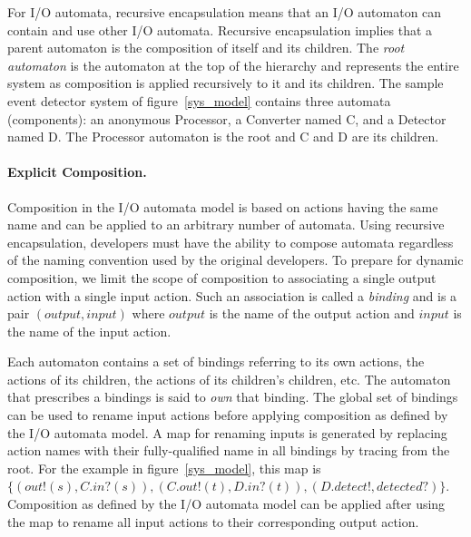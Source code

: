For I/O automata, recursive encapsulation means that an I/O automaton can contain and use other I/O automata.
Recursive encapsulation implies that a parent automaton is the composition of itself and its children.
The \emph{root automaton} is the automaton at the top of the hierarchy and represents the entire system as composition is applied recursively to it and its children.
The sample event detector system of figure~\ref{sys_model} contains three automata (components):  an anonymous Processor, a Converter named C, and a Detector named D.
The Processor automaton is the root and C and D are its children.

\paragraph{Explicit Composition.}
Composition in the I/O automata model is based on actions having the same name and can be applied to an arbitrary number of automata.
Using recursive encapsulation, developers must have the ability to compose automata regardless of the naming convention used by the original developers.
To prepare for dynamic composition, we limit the scope of composition to associating a single output action with a single input action.
Such an association is called a \emph{binding} and is a pair $(output, input)$ where $output$ is the name of the output action and $input$ is the name of the input action.

Each automaton contains a set of bindings referring to its own actions, the actions of its children, the actions of its children's children, etc.
The automaton that prescribes a bindings is said to \emph{own} that binding.
The global set of bindings can be used to rename input actions before applying composition as defined by the I/O automata model.
A map for renaming inputs is generated by replacing action names with their fully-qualified name in all bindings by tracing from the root.
For the example in figure~\ref{sys_model}, this map is $\{ (out!(s), C.in?(s)), (C.out!(t), D.in?(t)), (D.detect!, detected?) \}$.
Composition as defined by the I/O automata model can be applied after using the map to rename all input actions to their corresponding output action.

